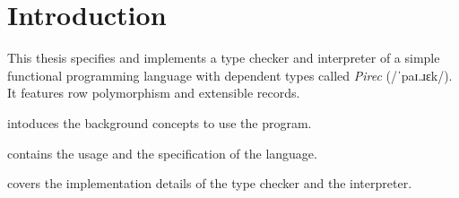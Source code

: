\chapter{Introduction}\label{ch:introduction}

This thesis specifies and implements a type checker and interpreter of a simple
functional programming language with dependent types called \emph{Pirec}
(/ˈpaɪ.ɹɛk/). It features row polymorphism and extensible records.

 intoduces the background concepts to use the program.

 contains the usage and the specification of the language.

 covers the implementation details of the type checker and the
interpreter.
